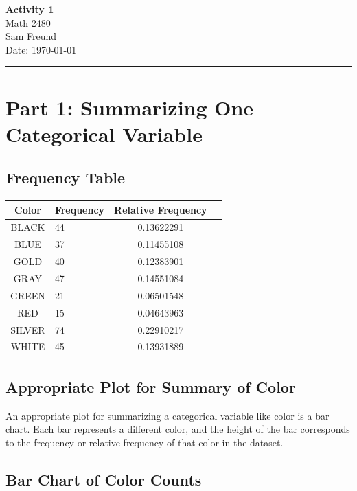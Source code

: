 \documentclass[12pt,a4paper]{article}
\newcommand{\authorName}{Sam Freund}
\newcommand{\courseName}{Math 2480}
\newcommand{\assignmentTitle}{Activity 1}
\newcommand{\dueDate}{\today}
\begin{document}
\begin{center}
    {\Large \textbf{\assignmentTitle}}\\[0.5em]
    {\large \courseName}\\[1em]
    \authorName\ \\
    Date: \dueDate
\end{center}

\vspace{1em}
\hrule
\vspace{2em}

\section{Part 1: Summarizing One Categorical Variable}

\subsection{Frequency Table}

\begin{tabular}{|c|l|c|c|}
\hline
Color & Frequency & Relative Frequency \\
\hline
BLACK & 44 & 0.13622291 \\
BLUE & 37 & 0.11455108 \\
GOLD & 40 & 0.12383901 \\
GRAY & 47 & 0.14551084 \\
GREEN & 21 & 0.06501548 \\
RED & 15 & 0.04643963 \\
SILVER & 74 & 0.22910217 \\
WHITE & 45 & 0.13931889 \\
\hline
\end{tabular}

\subsection{Appropriate Plot for Summary of Color}

An appropriate plot for summarizing a categorical variable like color is a bar chart. 
Each bar represents a different color, and the height of the bar corresponds to the 
frequency or relative frequency of that color in the dataset.

\pagebreak

\subsection{Bar Chart of Color Counts}
\end{document}
